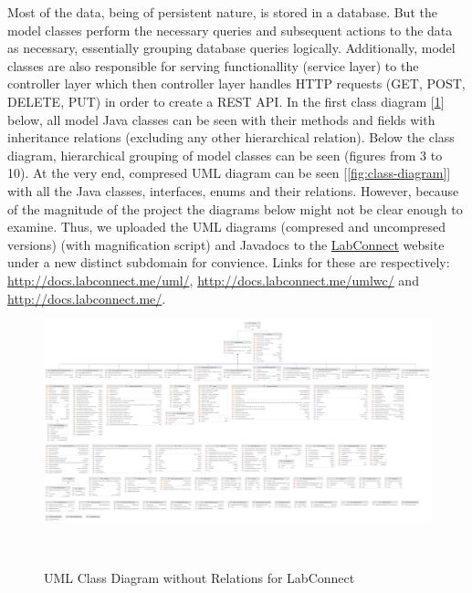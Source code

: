 \documentclass[a4paper, 12pt]{article}
\begin{document}
    Most of the data, being of persistent nature, is stored in a database. But the model classes
    perform the necessary queries and subsequent actions to the data as necessary,
    essentially grouping database queries logically. Additionally, model classes are also responsible for serving
    functionallity (service layer) to the controller layer which then controller layer handles HTTP requests (GET, POST, DELETE, PUT) in order
    to create a REST API. In the first class diagram [\ref{fig:straight-class-diagram}] below, all model Java classes can be seen with their
    methods and fields with inheritance relations (excluding any other hierarchical relation). Below the class diagram, hierarchical grouping of model
    classes can be seen (figures from 3 to 10). At the very end, compresed UML diagram can be seen [\ref{fig:class-diagram}] with all the Java classes,
    interfaces, enums and their relations. However, because of the magnitude of the project
    the diagrams below might not be clear enough to examine. Thus, we uploaded the UML diagrams (compresed and uncompresed versions)
    (with magnification script) and Javadocs to the \href{http://www.labconnect.me}{LabConnect} website under a new distinct subdomain for convience.
    Links for these are respectively: \href{http://docs.labconnect.me/uml/}{http://docs.labconnect.me/uml/},
    \href{http://docs.labconnect.me/umlwc/}{http://docs.labconnect.me/umlwc/} and \href{http://docs.labconnect.me/}{http://docs.labconnect.me/}.

    \begin{figure}[H]
        \centering
        \includegraphics[width=\textwidth]{uml-straight.png}
        \caption{UML Class Diagram without Relations for LabConnect}~\label{fig:straight-class-diagram}
    \end{figure}

    \pagebreak
\end{document}
